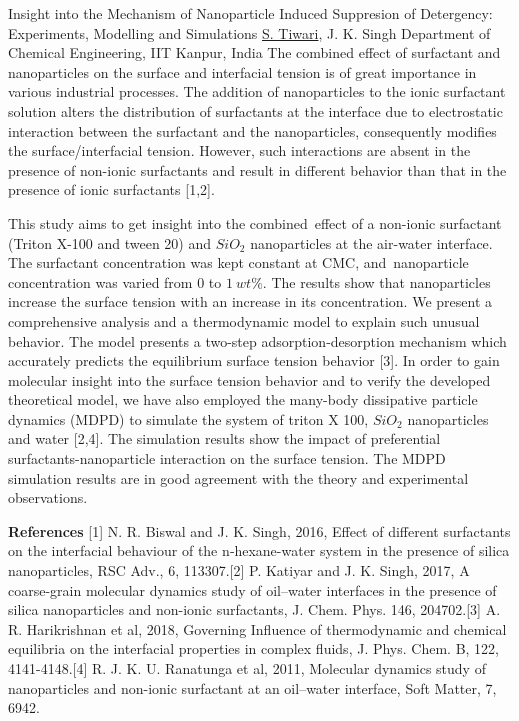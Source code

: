 
    \begin{abstract_online}{Insight into the Mechanism of Nanoparticle Induced Suppresion of Detergency: Experiments, Modelling and Simulations}{%
        \underline{S. Tiwari}, J. K. Singh}{%
        }{%
        Department of Chemical Engineering, IIT Kanpur, India}
    The combined effect of surfactant and nanoparticles on the surface and interfacial tension is of great importance in various industrial processes. The addition of nanoparticles to the ionic surfactant solution alters the distribution of surfactants at the interface due to electrostatic interaction between the surfactant and the nanoparticles, consequently modifies the surface/interfacial tension. However, such interactions are absent in the presence of non-ionic surfactants and result in different behavior than that in the presence of ionic surfactants [1,2]. \par  This study aims to get insight into the combined effect of a non-ionic surfactant (Triton X-100 and tween 20) and $SiO_2$ nanoparticles at the air-water interface. The surfactant concentration was kept constant at CMC, and nanoparticle concentration was varied from $0$ to $1 \ wt \%$. The results show that nanoparticles increase the surface tension with an increase in its concentration. We present a comprehensive analysis and a thermodynamic model to explain such unusual behavior. The model presents a two-step adsorption-desorption mechanism which accurately predicts the equilibrium surface tension behavior [3]. In order to gain molecular insight into the surface tension behavior and to verify the developed theoretical model, we have also employed the many-body dissipative particle dynamics (MDPD) to simulate the system of triton X 100, $SiO_2$ nanoparticles and water [2,4]. The simulation results show the impact of preferential surfactants-nanoparticle interaction on the surface tension. The MDPD simulation results are in good agreement with the theory and experimental observations. 
    
        \textbf{References} \newline{}[1] N. R. Biswal and J. K. Singh, 2016, Effect of different surfactants on the interfacial behaviour of the n‑hexane-water system in the presence of silica nanoparticles, RSC Adv., 6, 113307.\newline{}[2] P. Katiyar and J. K. Singh, 2017, A coarse-grain molecular dynamics study of oil–water interfaces in the presence of silica nanoparticles and non-ionic surfactants, J. Chem. Phys. 146, 204702.\newline{}[3] A. R. Harikrishnan et al, 2018, Governing Influence of thermodynamic and chemical equilibria on the interfacial properties in complex fluids, J. Phys. Chem. B, 122, 4141-4148.\newline{}[4] R. J. K. U. Ranatunga et al, 2011, Molecular dynamics study of nanoparticles and non-ionic surfactant at an oil–water interface, Soft Matter, 7, 6942.
    \end{abstract_online}
    